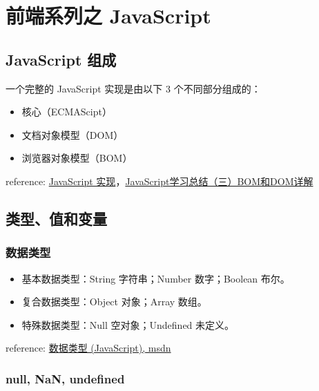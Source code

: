 \section{前端系列之 JavaScript}\hypertarget{javascript}{}\label{javascript}

\subsection{JavaScript 组成}\hypertarget{javascript-}{}\label{javascript-}

一个完整的 JavaScript 实现是由以下 3 个不同部分组成的：

\begin{itemize}
\item 核心（ECMAScipt）
\item 文档对象模型（DOM）
\item 浏览器对象模型（BOM）
\end{itemize}

reference: \href{http://www.w3school.com.cn/js/pro\_js\_implement.asp}{JavaScript 实现}，\href{http://segmentfault.com/a/1190000000654274}{JavaScript学习总结（三）BOM和DOM详解}

\subsection{类型、值和变量}\hypertarget{section}{}\label{section}

\subsubsection{数据类型}\hypertarget{section-1}{}\label{section-1}

\begin{itemize}
\item 基本数据类型：String 字符串；Number 数字；Boolean 布尔。
\item 复合数据类型：Object 对象；Array 数组。
\item 特殊数据类型：Null 空对象；Undefined 未定义。
\end{itemize}

reference: \href{https://msdn.microsoft.com/zh-cn/library/7wkd9z69(v=vs.94).aspx}{数据类型 (JavaScript), msdn}

\subsubsection{null, NaN, undefined}\hypertarget{null-nan-undefined}{}\label{null-nan-undefined}

